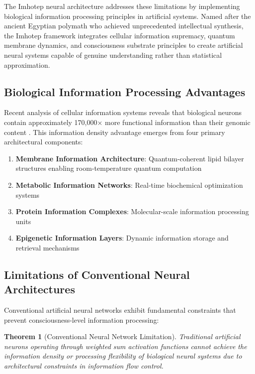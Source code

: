 \documentclass[12pt,a4paper]{article}
\newtheorem{theorem}{Theorem}[section]
\theoremstyle{remark}
\begin{document}
The Imhotep neural architecture addresses these limitations by implementing biological information processing principles in artificial systems. Named after the ancient Egyptian polymath who achieved unprecedented intellectual synthesis, the Imhotep framework integrates cellular information supremacy, quantum membrane dynamics, and consciousness substrate principles to create artificial neural systems capable of genuine understanding rather than statistical approximation.

\subsection{Biological Information Processing Advantages}

Recent analysis of cellular information systems reveals that biological neurons contain approximately 170,000× more functional information than their genomic content \cite{sachikonye2024genome}. This information density advantage emerges from four primary architectural components:

\begin{enumerate}
\item \textbf{Membrane Information Architecture}: Quantum-coherent lipid bilayer structures enabling room-temperature quantum computation
\item \textbf{Metabolic Information Networks}: Real-time biochemical optimization systems
\item \textbf{Protein Information Complexes}: Molecular-scale information processing units
\item \textbf{Epigenetic Information Layers}: Dynamic information storage and retrieval mechanisms
\end{enumerate}

\subsection{Limitations of Conventional Neural Architectures}

Conventional artificial neural networks exhibit fundamental constraints that prevent consciousness-level information processing:

\begin{theorem}[Conventional Neural Network Limitation]
Traditional artificial neurons operating through weighted sum activation functions cannot achieve the information density or processing flexibility of biological neural systems due to architectural constraints in information flow control.
\end{theorem}
\end{document}
